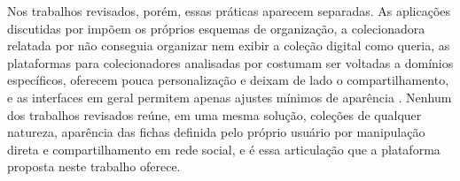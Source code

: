 Nos trabalhos revisados, porém, essas práticas aparecem separadas. As aplicações discutidas por  impõem os próprios esquemas
de organização, a colecionadora relatada por  não conseguia organizar nem exibir a coleção digital como queria, as plataformas para
colecionadores analisadas por  costumam ser voltadas a domínios específicos, oferecem pouca personalização e deixam de lado o
compartilhamento, e as interfaces em geral permitem apenas ajustes mínimos de aparência \cite{Alves2024}. Nenhum dos trabalhos revisados reúne, em
uma mesma solução, coleções de qualquer natureza, aparência das fichas definida pelo próprio usuário por manipulação direta e compartilhamento em rede social,
e é essa articulação que a plataforma proposta neste trabalho oferece.
